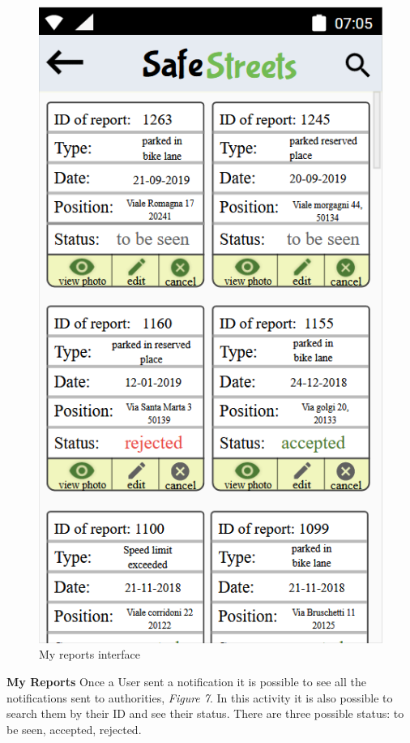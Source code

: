     \begin{figure}[h]
        \centering
        \includegraphics[scale=0.8]{Images/my_reports.png}
        \caption{My reports interface}
    \end{figure}
    \vspace{4mm}
    \noindent\textbf{My Reports}\newline
    Once a User sent a notification it is possible to see all the notifications sent to authorities, \textit{Figure 7}. In this activity it is also possible to search them by their ID and see their status. There are three possible status: to be seen, accepted, rejected.
        \newline\\

